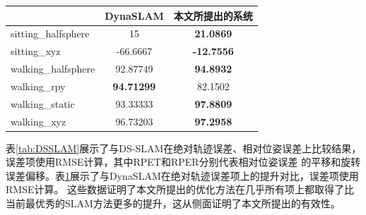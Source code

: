 \begin{table}[!htbp]
    \label{tab:DynaSLAM}
    \centering
    \footnotesize%
    \setlength{\tabcolsep}{8pt}%
    \renewcommand{\arraystretch}{1.3}%
    \begin{tabular}{l|c|c}
        \hline
        & \multicolumn{1}{c|}{DynaSLAM}         & \multicolumn{1}{c}{本文所提出的系统}           \\ \hline
        sitting\_halfsphere & 15                & \textbf{21.0869}  \\ \hline
        sitting\_xyz        & -66.6667          & \textbf{-12.7556} \\ \hline
        walking\_halfsphere & 92.87749          & \textbf{94.8932}  \\ \hline
        walking\_rpy        & \textbf{94.71299} & 82.1502           \\ \hline
        walking\_static     & 93.33333          & \textbf{97.8809}  \\ \hline
        walking\_xyz        & 96.73203          & \textbf{97.2958}  \\ \hline
        \hline
    \end{tabular}
\end{table}
表\ref{tab:DSSLAM}展示了与DS-SLAM在绝对轨迹误差、相对位姿误差上比较结果，误差项使用RMSE计算，其中RPET和RPER分别代表相对位姿误差
的平移和旋转误差偏移。表\ref{tab:DynaSLAM}展示了与DynaSLAM在绝对轨迹误差项上的提升对比，误差项使用RMSE计算。
这些数据证明了本文所提出的优化方法在几乎所有项上都取得了比当前最优秀的SLAM方法更多的提升，这从侧面证明了本文所提出的有效性。

